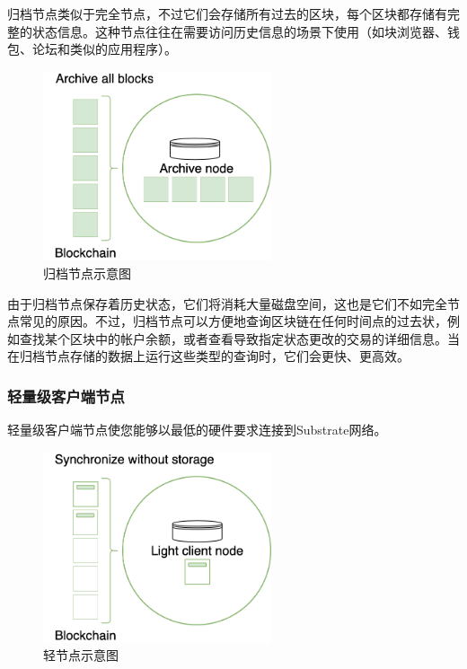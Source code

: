 归档节点类似于完全节点，不过它们会存储所有过去的区块，每个区块都存储有完整的状态信息。这种节点往往在需要访问历史信息的场景下使用（如块浏览器、钱包、论坛和类似的应用程序）。

\begin{figure}[htbp]
  \centering
  \includegraphics[width=0.6\textwidth]{images/archive-node.png}
  \caption{归档节点示意图}\label{归档节点示意图} %
\end{figure}

由于归档节点保存着历史状态，它们将消耗大量磁盘空间，这也是它们不如完全节点常见的原因。不过，归档节点可以方便地查询区块链在任何时间点的过去状，例如查找某个区块中的帐户余额，或者查看导致指定状态更改的交易的详细信息。当在归档节点存储的数据上运行这些类型的查询时，它们会更快、更高效。

\hypertarget{ux8f7bux91cfux7ea7ux5ba2ux6237ux7aefux8282ux70b9}{%
\subsubsection{轻量级客户端节点}\label{ux8f7bux91cfux7ea7ux5ba2ux6237ux7aefux8282ux70b9}}

轻量级客户端节点使您能够以最低的硬件要求连接到Substrate网络。

\begin{figure}[htbp]
  \centering
  \includegraphics[width=0.6\textwidth]{images/light-node.png}
  \caption{轻节点示意图}\label{轻节点示意图} %
\end{figure}

